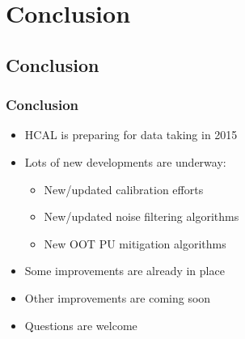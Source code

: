 \documentclass[bigger]{beamer}
\begin{document}
\section{Conclusion}
\label{sec-5}
\subsection{Conclusion}
\label{sec-5-1}
\begin{frame}
\frametitle{Conclusion}
\label{sec-5-1-1}
\begin{itemize}

\item HCAL is preparing for data taking in 2015
\label{sec-5-1-1-1}%

\item Lots of new developments are underway:
\label{sec-5-1-1-2}%
\begin{itemize}

\item New/updated calibration efforts
\label{sec-5-1-1-2-1}%

\item New/updated noise filtering algorithms
\label{sec-5-1-1-2-2}%

\item New OOT PU mitigation algorithms
\label{sec-5-1-1-2-3}%
\end{itemize} %

\item Some improvements are already in place
\label{sec-5-1-1-3}%

\item Other improvements are coming soon
\label{sec-5-1-1-4}%

\item Questions are welcome
\label{sec-5-1-1-5}%
\end{itemize} %
\end{frame}
\end{document}
